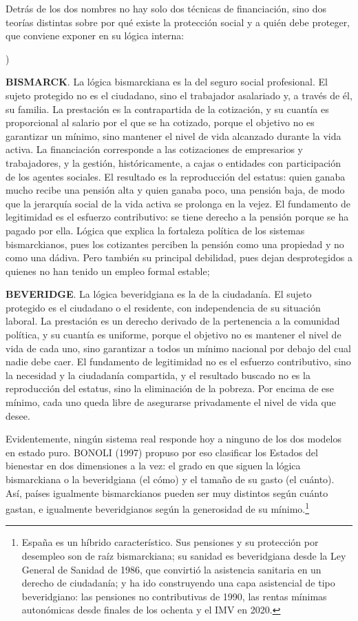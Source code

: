 \documentclass[10pt,a4paper]{article}
\newcounter{alphaitem}
\newenvironment{la}
      {\begin{list}{\alph{alphaitem})}{%
          \usecounter{alphaitem}%
          \setlength{\leftmargin}{1cm}%
          \setlength{\parskip}{3pt}%
          \setlength{\itemsep}{0pt}%
          \setlength{\parsep}{0pt}%
      }}
      {\end{list}}
\begin{document}
Detrás de los dos nombres no hay solo dos técnicas de financiación, sino dos teorías distintas sobre por qué existe la protección social y a quién debe proteger, que conviene exponer en su lógica interna:
\begin{la}
    \item \textbf{BISMARCK}. La lógica bismarckiana es la del seguro social profesional. El sujeto protegido no es el ciudadano, sino el trabajador asalariado y, a través de él, su familia. La prestación es la contrapartida de la cotización, y su cuantía es proporcional al salario por el que se ha cotizado, porque el objetivo no es garantizar un mínimo, sino mantener el nivel de vida alcanzado durante la vida activa. La financiación corresponde a las cotizaciones de empresarios y trabajadores, y la gestión, históricamente, a cajas o entidades con participación de los agentes sociales. El resultado es la reproducción del estatus: quien ganaba mucho recibe una pensión alta y quien ganaba poco, una pensión baja, de modo que la jerarquía social de la vida activa se prolonga en la vejez. El fundamento de legitimidad es el esfuerzo contributivo: se tiene derecho a la pensión porque se ha pagado por ella. Lógica que explica la fortaleza política de los sistemas bismarckianos, pues los cotizantes perciben la pensión como una propiedad y no como una dádiva. Pero también su principal debilidad, pues dejan desprotegidos a quienes no han tenido un empleo formal estable;
    \item \textbf{BEVERIDGE}. La lógica beveridgiana es la de la ciudadanía. El sujeto protegido es el ciudadano o el residente, con independencia de su situación laboral. La prestación es un derecho derivado de la pertenencia a la comunidad política, y su cuantía es uniforme, porque el objetivo no es mantener el nivel de vida de cada uno, sino garantizar a todos un mínimo nacional por debajo del cual nadie debe caer. El fundamento de legitimidad no es el esfuerzo contributivo, sino la necesidad y la ciudadanía compartida, y el resultado buscado no es la reproducción del estatus, sino la eliminación de la pobreza. Por encima de ese mínimo, cada uno queda libre de asegurarse privadamente el nivel de vida que desee.
\end{la}

Evidentemente, ningún sistema real responde hoy a ninguno de los dos modelos en estado puro. BONOLI (1997) propuso por eso clasificar los Estados del bienestar en dos dimensiones a la vez: el grado en que siguen la lógica bismarckiana o la beveridgiana (el cómo) y el tamaño de su gasto (el cuánto). Así, países igualmente bismarckianos pueden ser muy distintos según cuánto gastan, e igualmente beveridgianos según la generosidad de su mínimo.\footnote{España es un híbrido característico. Sus pensiones y su protección por desempleo son de raíz bismarckiana; su sanidad es beveridgiana desde la Ley General de Sanidad de 1986, que convirtió la asistencia sanitaria en un derecho de ciudadanía; y ha ido construyendo una capa asistencial de tipo beveridgiano: las pensiones no contributivas de 1990, las rentas mínimas autonómicas desde finales de los ochenta y el IMV en 2020.
}
\end{document}
